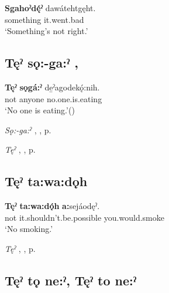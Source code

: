 \ea
\label{ex:tpart60}
\gll \textbf{Sgahoˀdę́ˀ} dawátehtgęht.\\
something it.went.bad\\
\glt ‘Something’s not right.’
\z

\subsection*{\textbf{Tęˀ sǫ:-ga:ˀ} , } \label{p:[tęˀ sǫ:-ga:ˀ]}

\ea
\label{ex:tpart61}
\gll \textbf{Tęˀ} \textbf{sǫgá:ˀ} de̱ˀagodekǫ́:nih.\\
not anyone no.one.is.eating\\
\glt ‘No one is eating.’(\cite[39]{michelson_ontario_2011})
\z

\begin{CayugaRelated}
\item \textit{Sǫ:-ga:ˀ} , , p. \pageref{p:[sǫ:-ga:ˀah] ‘someone’}\\
\item \textit{Tęˀ} , , p. \pageref{p:[tęˀ]}
\end{CayugaRelated}

\subsection*{\textbf{Tęˀ ta:wa:dǫh} } \label{p:[tęˀ ta:wa:dǫh]}

\ea
\label{ex:tpart62}
\gll \textbf{Tęˀ} \textbf{ta:wa:dǫ́h} \textbf{a:}sejáodęˀ.\\
not it.shouldn’t.be.possible you.would.smoke\\
\glt ‘No smoking.’
\z

\begin{CayugaRelated}
\item \textit{Tęˀ} , , p. \pageref{p:[tęˀ]}
\end{CayugaRelated}

\subsection*{\textbf{Tęˀ tǫ ne:ˀ, Tęˀ to ne:ˀ} } \label{p:[tęˀ tǫ ne:ˀ]}

